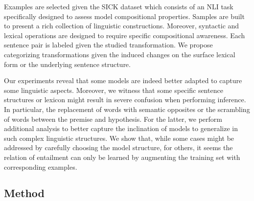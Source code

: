 Examples are selected given the SICK dataset \parencite{marelli_14} which consists of an NLI task specifically designed to assess model compositional properties. Samples are built to present a rich collection of linguistic constructions. Moreover, syntactic and lexical operations are designed to require specific compositional awareness. Each sentence pair is labeled given the studied transformation. We propose categorizing transformations given the induced changes on the surface lexical form or the underlying sentence structure. 


Our experiments reveal that some models are indeed better adapted to capture some linguistic aspects. Moreover, we witness that some specific sentence structures or lexicon might result in severe confusion when performing inference. In particular, the replacement of words with semantic opposites or the scrambling of words between the premise and hypothesis. For the latter, we perform additional analysis to better capture the inclination of models to generalize in such complex linguistic structures. We show that, while some cases might be addressed by carefully choosing the model structure, for others, it seems the relation of entailment can only be learned by augmenting the training set with corresponding examples.

\subsection{Method}


